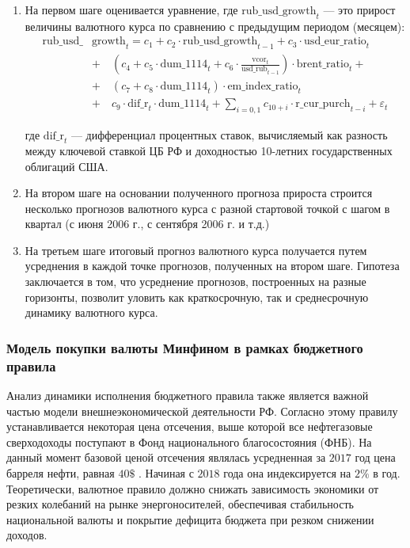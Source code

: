 \documentclass[a4paper, 14pt]{extarticle}
\newcommand{\lsum}{\sum\limits}
\begin{document}
\newpage
\begin{enumerate}
	\item На первом шаге оценивается уравнение, где $\text{rub\_usd\_growth}_{t}$ — это прирост величины валютного курса по сравнению с предыдущим периодом (месяцем):
	\begin{align*}
\text{rub\_usd\_}&\text{growth}_{t} = c_1 + c_2 \cdot \text{rub\_usd\_growth}_{t-1} + c_3 \cdot \text{usd\_eur\_ratio}_{t} \\
& + \quad (c_4 + c_5 \cdot \text{dum\_1114}_t + c_6 \cdot \frac{\text{vcor}_t}{\text{usd\_rub}_{t-1}})\cdot \text{brent\_ratio}_t + \\
&  + \quad (c_7  + c_8 \cdot \text{dum\_1114}_t)\cdot \text{em\_index\_ratio}_t \\   
	& + \quad c_9 \cdot \text{dif\_r}_t \cdot \text{dum\_1114}_t + 
	\lsum_{i = 0, 1} c_{10+i}\cdot\text{r\_cur\_purch}_{t-i} + \varepsilon_{t}
	\end{align*}
	
	где $\text{dif\_r}_t$ — дифференциал процентных ставок, вычисляемый как разность между ключевой ставкой ЦБ РФ и доходностью 10-летних государственных облигаций США.

	\item На втором шаге на основании полученного прогноза прироста строится несколько прогнозов валютного курса с разной стартовой точкой с шагом в квартал (с июня 2006 г., с сентября 2006 г. и т.д.)
	\item На третьем шаге итоговый прогноз валютного курса получается путем усреднения в каждой точке прогнозов, полученных на втором шаге. 
	Гипотеза заключается в том, что усреднение прогнозов, построенных на разные горизонты, позволит уловить как краткосрочную, так и среднесрочную динамику валютного курса.
\end{enumerate}

\subsubsection*{Модель покупки валюты Минфином в рамках бюджетного правила}

Анализ динамики исполнения бюджетного правила также является важной частью модели внешнеэкономической деятельности РФ.
Согласно этому правилу устанавливается некоторая цена отсечения, выше которой все нефтегазовые сверходоходы поступают в Фонд национального благосостояния (ФНБ).
На данный момент базовой ценой отсечения являлась усредненная за $2017$ год цена барреля нефти, равная $40\$$ . 
Начиная с $2018$ года она индексируется на $2 \%$ в год.
Теоретически, валютное правило должно снижать зависимость экономики от резких колебаний на рынке энергоносителей, обеспечивая стабильность национальной валюты и покрытие дефицита бюджета при резком снижении доходов.
\end{document}
